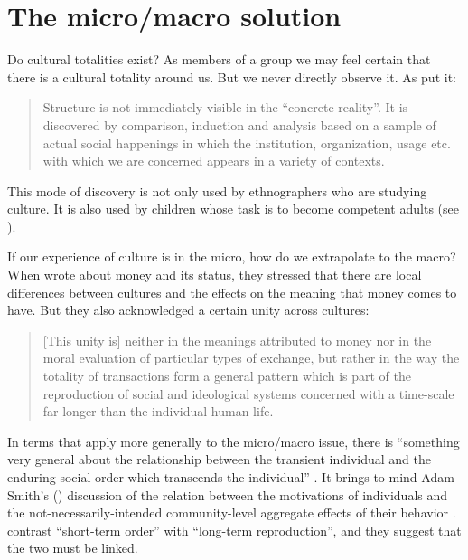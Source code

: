 
\chapter{The micro/macro solution}
\label{micromacrosolution}

Do cultural totalities exist? As members of a group we may feel certain that 
there is a cultural totality around us. But we never directly observe it. As 
\citet[56]{fortes_social_1949} put it:

\begin{quotation}
Structure is not immediately visible in the ``concrete 
reality''. It is discovered by comparison, induction and analysis based 
on a sample of actual social happenings in which the institution, 
organization, usage etc. with which we are concerned appears in a 
variety of contexts. \citep[56]{fortes_social_1949}
\end{quotation}

This mode of discovery is not only used by ethnographers who are studying culture. It is also used by children whose task is to become competent adults (see \citealt{brown_language_2014}). 



If our experience of culture is in the micro, how do we 
extrapolate to the macro? When \citeauthor{parry_money_1989} wrote about money 
and its status, they stressed that there are local differences between cultures and the 
effects on the meaning that money comes to have. But they also acknowledged a 
certain unity across cultures: 

\begin{quotation}
[This unity is] neither in the meanings 
attributed to money nor in the moral evaluation of particular types of 
exchange, but rather in the way the totality of transactions form a 
general pattern which is part of the reproduction of social and 
ideological systems concerned with a time-scale far longer than the 
individual human life. \citep[1]{parry_money_1989} 
\end{quotation}



In terms that apply more generally to the micro/macro issue, there is ``something very general about the relationship between the 
transient individual and the enduring social order which transcends the 
individual'' \citep[2]{parry_money_1989}. It brings to mind Adam Smith's (\citeyear[book 4, ch. 2]{smith_inquiry_1776}) discussion of the relation between the 
motivations of individuals and the not-necessarily-intended 
community-level aggregate effects of their behavior \citep{schelling_micromotives_1978,hedstrom_social_1998,rogers_diffusion_2003}. \citet[29]{parry_money_1989} contrast ``short-term order'' with ``long-term reproduction'', and they suggest that the two must be linked. 



